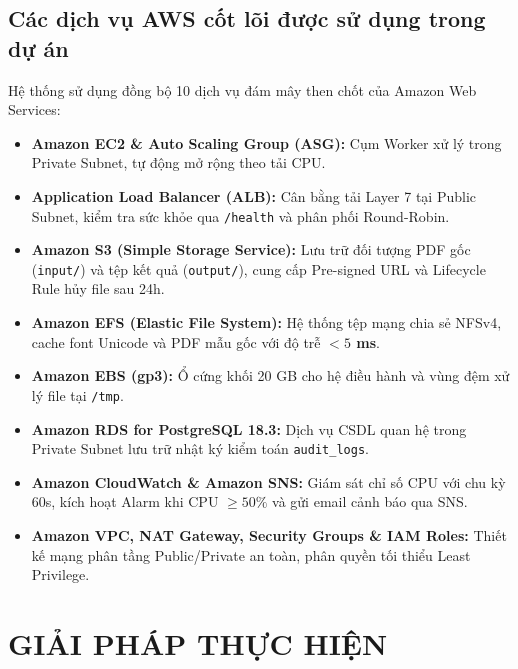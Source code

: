 \documentclass[12pt,a4paper]{report}
\begin{document}
\section{Các dịch vụ AWS cốt lõi được sử dụng trong dự án}
Hệ thống sử dụng đồng bộ 10 dịch vụ đám mây then chốt của Amazon Web Services:
\begin{itemize}
    \item \textbf{Amazon EC2 \& Auto Scaling Group (ASG):} Cụm Worker xử lý trong Private Subnet, tự động mở rộng theo tải CPU.
    \item \textbf{Application Load Balancer (ALB):} Cân bằng tải Layer 7 tại Public Subnet, kiểm tra sức khỏe qua \texttt{/health} và phân phối Round-Robin.
    \item \textbf{Amazon S3 (Simple Storage Service):} Lưu trữ đối tượng PDF gốc (\texttt{input/}) và tệp kết quả (\texttt{output/}), cung cấp Pre-signed URL và Lifecycle Rule hủy file sau 24h.
    \item \textbf{Amazon EFS (Elastic File System):} Hệ thống tệp mạng chia sẻ NFSv4, cache font Unicode và PDF mẫu gốc với độ trễ \textbf{$< 5$ ms}.
    \item \textbf{Amazon EBS (gp3):} Ổ cứng khối 20 GB cho hệ điều hành và vùng đệm xử lý file tại \texttt{/tmp}.
    \item \textbf{Amazon RDS for PostgreSQL 18.3:} Dịch vụ CSDL quan hệ trong Private Subnet lưu trữ nhật ký kiểm toán \texttt{audit\_logs}.
    \item \textbf{Amazon CloudWatch \& Amazon SNS:} Giám sát chỉ số CPU với chu kỳ 60s, kích hoạt Alarm khi CPU $\ge 50\%$ và gửi email cảnh báo qua SNS.
    \item \textbf{Amazon VPC, NAT Gateway, Security Groups \& IAM Roles:} Thiết kế mạng phân tầng Public/Private an toàn, phân quyền tối thiểu Least Privilege.
\end{itemize}

\chapter{GIẢI PHÁP THỰC HIỆN}
\end{document}
